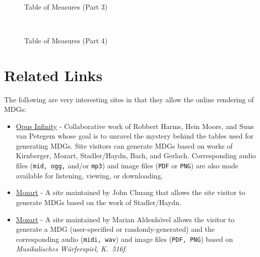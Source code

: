 \documentclass[a4paper,x11names,svgnames,10pt]{article}
\begin{document}
{\newpage
${}_{}$\\
\vspace{0.10in}
\begin{figure}[H]
	\centering
	\def\svgwidth{0.975\columnwidth}
	
	\caption{Table of Measures (Part 3)}
	\label{fig:meas3}
\end{figure}

\newpage
${}_{}$\\
\vspace{0.10in}
\begin{figure}[H]
	\centering
	\def\svgwidth{0.975\columnwidth}
	
	\caption{Table of Measures (Part 4)}
	\label{fig:meas4}
\end{figure}


\section{Related Links}
The following are very interesting sites in that they allow the online rendering of MDGs:
\begin{itemize}
	\item \href{https://opus-infinity.org}{Opus Infinity} - Collaborative work of Robbert Harms, Hein Moors, and Suus van Petegem whose goal is to unravel the mystery behind the tables used for generating MDGs.  Site visitors can generate MDGs based on works of Kirnberger, Mozart, Stadler/Haydn, Bach, and Gerlach.  Corresponding audio files ({\tt mid, ogg,} and/or {\tt mp3}) and image files ({\tt PDF} or {\tt PNG}) are also made available for listening, viewing, or downloading.
	
	\item  \href{http://sunsite.univie.ac.at/Mozart/dice/}{Mozart} - A site maintained by John Chuang that allows the site visitor to generate MDGs based on the work of Stadler/Haydn.
	
	\item  \href{https://marian-aldenhoevel.de/mozart/}{Mozart} - A site maintained by Marian Aldenh\"{o}vel allows the visitor to generate a MDG (user-specified or randomly-generated) and the corresponding audio ({\tt midi, wav}) and image files ({\tt PDF, PNG}) based on {\em Musikalisches W\"{u}rferspiel, K.\ 516f}.
	

\end{itemize}}
\end{document}
